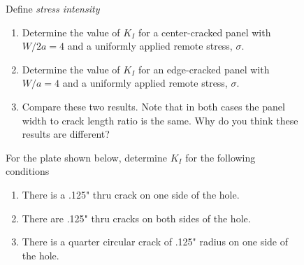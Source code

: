 \documentclass[12pt, oneside]{article}
\begin{document}
\begin{enumerate}

\begin{figure}[H]
	\item
Define \emph{stress intensity}
\end{figure}


\begin{figure}[H]
	\item
\begin{enumerate}
	\item Determine the value of $K_I$ for a center-cracked panel with $W/2a = 4$ and a uniformly applied remote stress, $\sigma$.
	\item Determine the value of $K_I$ for an edge-cracked panel with $W/a = 4$ and a uniformly applied remote stress, $\sigma$.
	\item Compare these two results. Note that in both cases the panel width to crack length ratio is the same. Why do you think these results are different?
\end{enumerate}
\end{figure}

\begin{figure}[H]
	\item For the plate shown below, determine $K_I$ for the following conditions
	\begin{enumerate}
		\item There is a .125" thru crack on one side of the hole.
		\item There are .125" thru cracks on both sides of the hole.
		\item There is a quarter circular crack of .125" radius on one side of the hole.
	\end{enumerate}
	\centering
	\label{fig:problem3}
\end{figure}


\end{enumerate}
\end{document}
